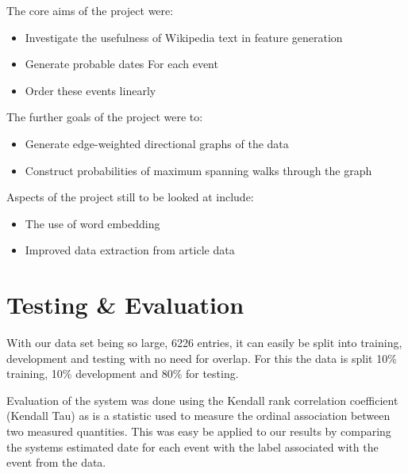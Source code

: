 \documentclass[12pt]{report}
\begin{document}
        \noindent The core aims of the project were: 
            \begin{itemize}
            \item Investigate the usefulness of Wikipedia text in feature generation
            \item Generate probable dates For each event
            \item Order these events linearly
            \end{itemize}

        \noindent The further goals of the project were to:
        \begin{itemize}
          \item Generate edge-weighted directional graphs of the data
          \item Construct probabilities of maximum spanning walks through the graph
        \end{itemize}

        \noindent Aspects of the project still to be looked at include:
        \begin{itemize}
          \item The use of word embedding
          \item Improved data extraction from article data
        \end{itemize}

        \section{Testing \& Evaluation}
        With our data set being so large, 6226 entries, it can
        easily be split into training, development and testing with no
        need for overlap. For this the data is split 10\% training,
        10\% development and 80\% for testing.


        Evaluation of the system was done using the Kendall rank correlation coefficient (Kendall Tau)
        as  is a statistic used to measure the ordinal association between two
        measured quantities. This was easy be applied to our results
        by comparing the systems estimated date for each event
        with the label associated with the event from the data.

        
\end{document}
